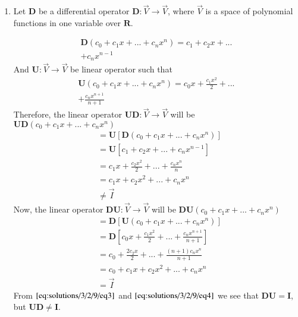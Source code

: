 \begin{enumerate}
		
		\item Let $\mathbf{D}$ be a differential operator $\mathbf{D} : \Vec{V} \xrightarrow{} \Vec{V}$, where $\vec{V}$ is a space of polynomial functions in one variable over $\mathbf{R}$.
		
		\begin{align}
			\mathbf{D}\left( c_0 + c_1x + ... + c_nx^{n}\right) = c_1 + c_2x + ... \nonumber\\+ c_nx^{n-1}
		\end{align}
		And $\mathbf{U} : \Vec{V} \xrightarrow{} \Vec{V}$ be linear operator such that
		\begin{align}
			\mathbf{U}\left( c_0 + c_1x + ... + c_nx^{n}\right) = c_0x + \frac{c_1x^{2}}{2} + ... \nonumber\\+ \frac{c_nx^{n+1}}{n+1}
		\end{align}
		Therefore, the linear operator $\mathbf{U}\mathbf{D} : \Vec{V} \xrightarrow{} \Vec{V}$ will be $\mathbf{U}\mathbf{D}\left( c_0 + c_1x + ... + c_nx^{n}\right)$
		\begin{align}\label{eq:solutions/3/2/9/eq3}
			&= \mathbf{U}\left[\mathbf{D}\left( c_0 + c_1x + ... + c_nx^{n}\right)\right] \nonumber\\
			&= \mathbf{U}\left[c_1 + c_2x + ... + c_nx^{n-1}\right]\nonumber\\
			&= c_1x + \frac{c_2x^{2}}{2} + ... + \frac{c_nx^{n}}{n}\nonumber\\
			&= c_1x + c_2x^{2} + ... + c_nx^{n}\nonumber\\
			&\neq \vec{I}
		\end{align}
		Now, the linear operator $\mathbf{D}\mathbf{U} : \Vec{V} \xrightarrow{} \Vec{V}$ will be $\mathbf{D}\mathbf{U}\left( c_0 + c_1x + ... + c_nx^{n}\right)$
		\begin{align}\label{eq:solutions/3/2/9/eq4}
			&= \mathbf{D}\left[\mathbf{U}\left( c_0 + c_1x + ... + c_nx^{n}\right)\right] \nonumber\\
			&= \mathbf{D}\left[c_0x + \frac{c_1x^{2}}{2} + ... + \frac{c_nx^{n+1}}{n+1}\right]\nonumber\\
			&= c_0 + \frac{2c_2x}{2} + ... + \frac{\left( n+1\right)c_nx^{n}}{n+1}\nonumber\\
			&= c_0 + c_1x + c_2x^{2} + ... + c_nx^{n}\nonumber\\
			&= \vec{I}
		\end{align}
		From $\eqref{eq:solutions/3/2/9/eq3}$ and $\eqref{eq:solutions/3/2/9/eq4}$ we see that $\mathbf{D}\mathbf{U} = \mathbf{I}$, but $\mathbf{U}\mathbf{D} \neq \mathbf{I}$. 
	\end{enumerate}

